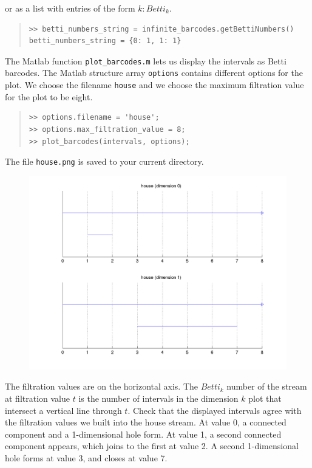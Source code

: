 \documentclass[amscd, amssymb, verbatim]{amsart}[12pt]
\theoremstyle{remark}
\theoremstyle{remark}
\theoremstyle{remark}
\begin{document}
or as a list with entries of the form $k: Betti_k$.

\begin{quote} \begin{verbatim}
>> betti_numbers_string = infinite_barcodes.getBettiNumbers()
betti_numbers_string = {0: 1, 1: 1} 
\end{verbatim} \end{quote}

The Matlab function \texttt{plot\_barcodes.m} lets us display the intervals as Betti barcodes. The Matlab structure array \texttt{options} contains different options for the plot. We choose the filename \texttt{house} and we choose the maximum filtration value for the plot to be eight.
\begin{quote} \begin{verbatim}
>> options.filename = 'house';
>> options.max_filtration_value = 8;
>> plot_barcodes(intervals, options);
\end{verbatim} \end{quote}

The file \texttt{house.png} is saved to your current directory.

\begin{figure}[htp]
	\begin{center}
    	\includegraphics[width=6in]{house.png}
   	\end{center}
\end{figure}
\FloatBarrier

The filtration values are on the horizontal axis. The $Betti_k$ number of the stream at filtration value $t$ is the number of intervals in the dimension $k$ plot that intersect a vertical line through $t$. Check that the displayed intervals agree with the filtration values we built into the house stream. At value 0, a connected component and a 1-dimensional hole form. At value 1, a second connected component appears, which joins to the first at value 2. A second 1-dimensional hole forms at value 3, and closes at value 7. 
\end{document}
